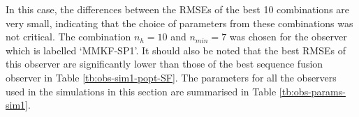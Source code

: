 

In this case, the differences between the RMSEs of the best 10 combinations are very small, indicating that the choice of parameters from these combinations was not critical. The combination $n_h=10$ and $n_{min}=7$ was chosen for the observer which is labelled `MMKF-SP1'. It should also be noted that the best RMSEs of this observer are significantly lower than those of the best sequence fusion observer in Table \ref{tb:obs-sim1-popt-SF}. The parameters for all the observers used in the simulations in this section are summarised in Table \ref{tb:obs-params-sim1}.

